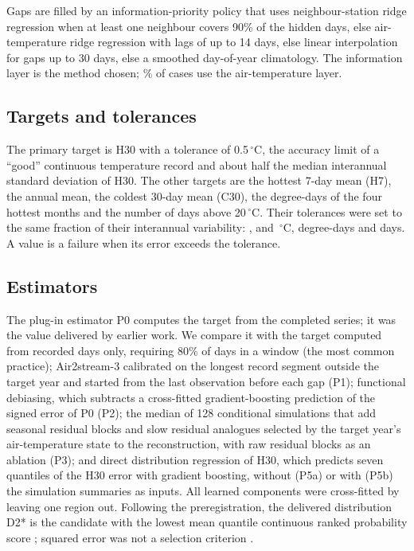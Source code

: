 \documentclass[draft]{agujournal2025}
\begin{document}
Gaps are filled by an information-priority policy that uses neighbour-station ridge regression when at least one neighbour covers 90\% of the hidden days, else air-temperature ridge regression with lags of up to 14 days, else linear interpolation for gaps up to 30 days, else a smoothed day-of-year climatology. The information layer is the method chosen; \TAirLayerShare\% of cases use the air-temperature layer.

\subsection{Targets and tolerances}
The primary target is H30 with a tolerance of 0.5\,$^{\circ}$C, the accuracy limit of a ``good'' continuous temperature record \cite{wagner2006} and about half the median interannual standard deviation of H30. The other targets are the hottest 7-day mean (H7), the annual mean, the coldest 30-day mean (C30), the degree-days of the four hottest months and the number of days above 20\,$^{\circ}$C. Their tolerances were set to the same fraction of their interannual variability: \TTolHSeven, \TTolMean{} and \TTolCThirty\,$^{\circ}$C, \TTolDD{} degree-days and \TTolDays{} days. A value is a failure when its error exceeds the tolerance.

\subsection{Estimators}
The plug-in estimator P0 computes the target from the completed series; it was the value delivered by earlier work. We compare it with the target computed from recorded days only, requiring 80\% of days in a window (the most common practice); Air2stream-3 \cite{toffolon2015} calibrated on the longest record segment outside the target year and started from the last observation before each gap (P1); functional debiasing, which subtracts a cross-fitted gradient-boosting \cite{ke2017} prediction of the signed error of P0 (P2); the median of 128 conditional simulations that add seasonal residual blocks and slow residual analogues selected by the target year's air-temperature state to the reconstruction, with raw residual blocks as an ablation (P3); and direct distribution regression of H30, which predicts seven quantiles of the H30 error with gradient boosting, without (P5a) or with (P5b) the simulation summaries as inputs. All learned components were cross-fitted by leaving one region out. Following the preregistration, the delivered distribution D2* is the candidate with the lowest mean quantile continuous ranked probability score \cite{gneiting2007}; squared error was not a selection criterion \cite{naf2023}.
\end{document}
